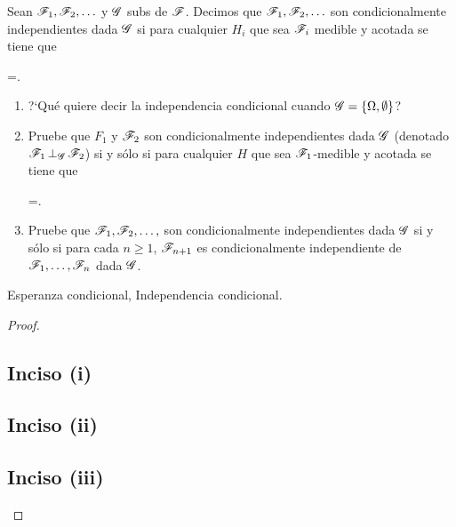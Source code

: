 \begin{problema}
	Sean $\mathscr{F}_1,\mathscr{F}_2,\ldots $ y $\mathscr{G}$ sub\sa s de $\mathscr{F}$. 
	Decimos que $\mathscr{F}_1,\mathscr{F}_2,\ldots$ son condicionalmente independientes dada $\mathscr{G}$ si para 
	cualquier $H_i$ que sea $\mathscr{F}_i$ medible y acotada se tiene que
	
	\begin{esn}
		=\cdots {}.
	\end{esn}
	
	\begin{enumerate}
		\item[(i)]	[\ref{problema4_1:inciso1}]
			?`Qu\'e quiere decir la independencia condicional cuando $\mathscr{G}=\left\{  \Omega ,\emptyset\right\} $?
			\par\null

		\item[(ii)] 	[\ref{problema4_1:inciso2}]
			Pruebe que $F_1$ y $\mathscr{F}_2$ son condicionalmente independientes dada $\mathscr{G}$ 
			(denotado $\condind{\F_1}{\F_2}{\G}$) si y s\'olo si para 
			cualquier $H$ que sea $\mathscr{F}_1$-medible y acotada se tiene que
			\begin{esn}
				=\espc{H}{\G}.
			\end{esn}

		\item[(iii)]	[\ref{problema4_1:inciso3}]
			Pruebe que $\mathscr{F}_1,\mathscr{F}_2,\ldots, $ son condicionalmente independientes dada 
			$\mathscr{G}$ si y s\'olo si para cada $n\geq 1$, $\mathscr{F}_{n+1}$ es condicionalmente 
			independiente de $\mathscr{F}_1,\ldots, \mathscr{F}_n$ dada $\mathscr{G}$. 
	\end{enumerate}

	 Esperanza condicional, Independencia condicional.
\end{problema}

\begin{proof}
    \subsection{Inciso (i)} \label{problema4_1:inciso1}
    
    \newpage

    \subsection{Inciso (ii)} \label{problema4_1:inciso2}
    
    \newpage

    \subsection{Inciso (iii)} \label{problema4_1:inciso3}
    
\end{proof}